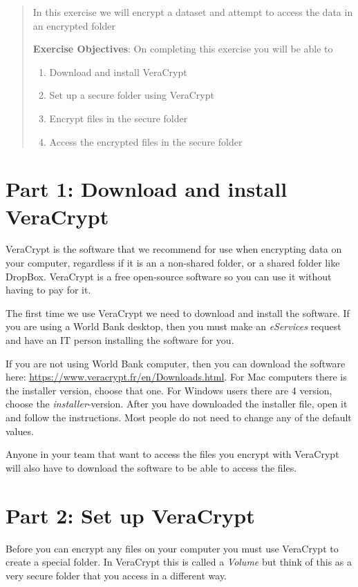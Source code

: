 \documentclass{tufte-handout}
\begin{document}
\begin{abstract}
In this exercise we will encrypt a dataset and attempt to access the data in an encrypted folder

\bigskip\noindent \textbf{Exercise Objectives}: On completing this exercise you will be able to
\begin{enumerate}
  \item Download and install VeraCrypt
  \item Set up a secure folder using VeraCrypt
  \item Encrypt files in the secure folder
  \item Access the encrypted files in the secure folder
\end{enumerate}
\end{abstract}

\section{Part 1: Download and install VeraCrypt}

VeraCrypt is the software that we recommend for use when encrypting data on your computer, regardless if it is an a non-shared folder, or a shared folder like DropBox. VeraCrypt is a free open-source software so you can use it without having to pay for it.

The first time we use VeraCrypt we need to download and install the software. If you are using a World Bank desktop, then you must make an \textit{eServices} request and have an IT person installing the software for you.

If you are not using World Bank computer, then you can download the software here: \url{https://www.veracrypt.fr/en/Downloads.html}. For Mac computers there is the installer version, choose that one. For Windows users there are 4 version, choose the \textit{installer}-version. After you have downloaded the installer file, open it and follow the instructions. Most people do not need to change any of the default values.

Anyone in your team that want to access the files you encrypt with VeraCrypt will also have to download the software to be able to access the files.

\section{Part 2: Set up VeraCrypt}

Before you can encrypt any files on your computer you must use VeraCrypt to create a special folder. In VeraCrypt this is called a \textit{Volume} but think of this as a very secure folder that you access in a different way.
\end{document}
